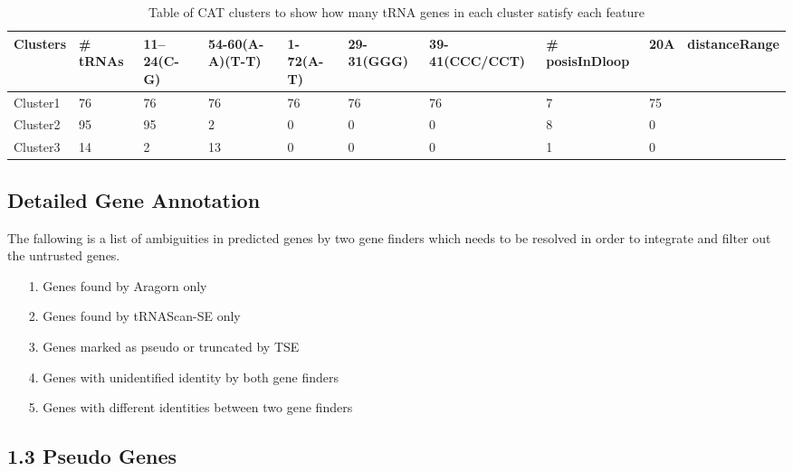\documentclass[table,
12pt, %
a4paper, %
oneside, %
headinclude,footinclude, %
BCOR5mm, %
]{scrartcl}
\begin{document}
\begin{table}[htbp]
  \caption{Table of CAT clusters to show how many tRNA genes in each cluster satisfy each feature}
  \begin{adjustbox}{width=\textwidth,center}
    \begin{tabular}{|l|lllllllll|}
      \hline
      Clusters & \# tRNAs & 11–24(C-G) & 54-60(A-A)(T-T) & 1-72(A-T) & 29-31(GGG) & 39-41(CCC/CCT) & \#  posisInDloop & 20A & distanceRange \\
      \hline
      Cluster1&76&76&76&76&76&76&7&75\\
      Cluster2&95&95&2&0&0&0&8&0\\
      Cluster3&14&2&13&0&0&0&1&0\\
      \hline
    \end{tabular}
    \label{table:1}
  \end{adjustbox}
\end{table}


\subsection{\textbf{Detailed Gene Annotation}}
The fallowing is a list of ambiguities in predicted genes by two gene finders which needs to be resolved in order to integrate and filter out the untrusted genes.
\begin{itemize}
  \item[1.] Genes found by Aragorn only
  \item[2.] Genes found by tRNAScan-SE only
  \item[3.] Genes marked as pseudo or truncated by TSE
  \item[4.] Genes with unidentified identity by both gene finders
  \item[5.] Genes with different identities between two gene finders
\end{itemize}



\subsection{\textbf{1.3 Pseudo Genes}}
\end{document}
